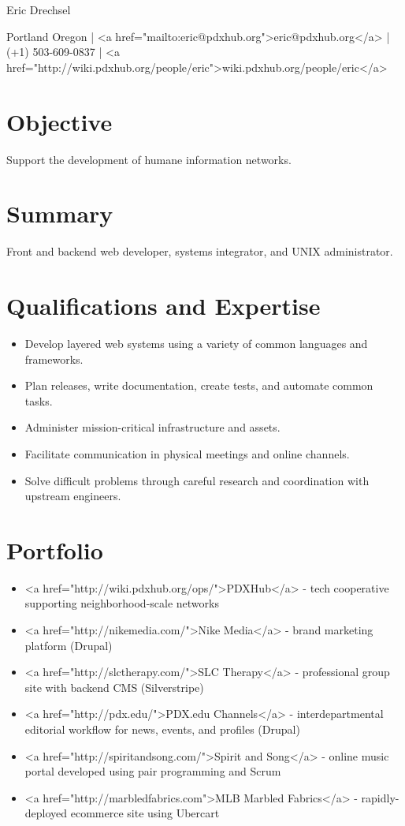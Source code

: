 \documentclass[a4paper,12pt,openany,oneside]{memoir}
\newlength{\myindent}
\newlength{\myskipbig}		%
\newcommand{\mytitle}[1]%
    {{\newpage\vspace*{-1.2\topskip}%
     \Large\mdseries\raggedright{#1}%
     \vspace{\myskipbig}}} %
\newenvironment{myul}%
    {\begin{itemize} [topsep=0pt, partopsep=0pt, itemsep=0pt, %
     parsep=\parskip, leftmargin=\myindent, labelindent=1.0pt, %
     labelsep=*, label={\rule[0.2ex]{0.7ex}{0.7ex}}]}%
    {\end{itemize} \vspace{0ex} }
\begin{document}
\mytitle{Eric Drechsel}

Portland Oregon | <a href="mailto:eric@pdxhub.org">eric@pdxhub.org</a> | (+1) 503-609-0837 | <a href="http://wiki.pdxhub.org/people/eric">wiki.pdxhub.org/people/eric</a> 

\chapter{Objective}

Support the development of humane information networks.

\chapter{Summary}

Front and backend web developer, systems integrator, and UNIX administrator.

\chapter{Qualifications and Expertise}

\begin{myul}
\item Develop layered web systems using a variety of common languages and frameworks.
\item Plan releases, write documentation, create tests, and automate common tasks.
\item Administer mission-critical infrastructure and assets.
\item Facilitate communication in physical meetings and online channels.
\item Solve dif\kern0pt{}ficult problems through careful research and coordination with upstream engineers. 
\end{myul}

\chapter{Portfolio}

\begin{myul}
\item <a href="http://wiki.pdxhub.org/ops/">PDXHub</a> - tech cooperative supporting neighborhood-scale networks
\item <a href="http://nikemedia.com/">Nike Media</a> - brand marketing platform (Drupal)
\item <a href="http://slctherapy.com/">SLC Therapy</a> - professional group site with backend CMS (Silverstripe)
\item <a href="http://pdx.edu/">PDX.edu Channels</a> - interdepartmental editorial workflow for news, events, and profiles (Drupal)
\item <a href="http://spiritandsong.com/">Spirit and Song</a> - online music portal developed using pair programming and Scrum
\item <a href="http://marbledfabrics.com">MLB Marbled Fabrics</a> - rapidly-deployed ecommerce site using Ubercart
\end{myul}
\end{document}
